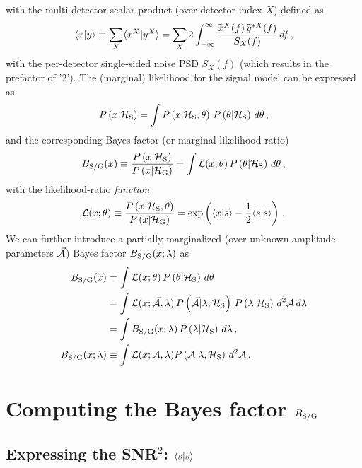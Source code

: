 \documentclass[aps,prd,onecolumn,notitlepage,nofootinbib,superscriptaddress,altaffilletter,floatfix]{revtex4-1}
\begin{document}
with the multi-detector scalar product (over detector index $X$) defined as
\begin{equation}
  \label{eq:5}
  \langle x|y\rangle\equiv \sum_{X} \langle x^X|y^X\rangle = \sum_X 2\int_{-\infty}^{\infty} \frac{\widetilde{x}^X(f)\,\widetilde{y}^{*X}(f)}{S_X(f)}\,df\,,
\end{equation}
with the per-detector single-sided noise PSD $S_X(f)$ (which results in the prefactor of '2').
The (marginal) likelihood for the signal model can be expressed as
\begin{equation}
  \label{eq:6}
  P\left(x|\mathcal{H}_{\mathrm{S}}\right) = \int P\left(x|\mathcal{H}_{\mathrm{S}},\theta\right)\,P\left(\theta|\mathcal{H}_{\mathrm{S}}\right)\,d\theta\,,
\end{equation}
and the corresponding Bayes factor (or marginal likelihood ratio)
\begin{equation}
  \label{eq:7}
  B_{\mathrm{S/G}}(x) \equiv \frac{P\left(x|\mathcal{H}_{\mathrm{S}}\right)}{P\left(x|\mathcal{H}_{\mathrm{G}}\right)} = \int \mathcal{L}(x;\theta)\,P\left(\theta|\mathcal{H}_{\mathrm{S}}\right)\,d\theta\,,
\end{equation}
with the likelihood-ratio \emph{function}
\begin{equation}
  \label{eq:8}
  \mathcal{L}(x;\theta) \equiv \frac{P\left(x|\mathcal{H}_{\mathrm{S}},\theta\right)}{P\left(x|\mathcal{H}_{\mathrm{G}}\right)} = \exp\left(\langle x|s\rangle - \frac{1}{2}\langle s|s\rangle\right)\,.
\end{equation}
We can further introduce a partially-marginalized (over unknown amplitude parameters $\vec{\mathcal{A}}$) Bayes factor $B_{\mathrm{S/G}}(x;\lambda)$ as
\begin{align}
  B_{\mathrm{S/G}}(x) &= \int \mathcal{L}(x;\theta)\,P\left(\theta|\mathcal{H}_{\mathrm{S}}\right)\,d\theta \notag\\
          &= \int \mathcal{L}(x;\vec{\mathcal{A}},\lambda)\,P\left(\vec{\mathcal{A}}|\lambda,\mathcal{H}_{\mathrm{S}}\right)\,P\left(\lambda|\mathcal{H}_{\mathrm{S}}\right)\,d^2\mathcal{A}\,d\lambda \notag\\
          &= \int B_{\mathrm{S/G}}(x;\lambda) \,P\left(\lambda|\mathcal{H}_{\mathrm{S}}\right)\,d\lambda\,,   \label{eq:23a}\\
  B_{\mathrm{S/G}}(x;\lambda) &\equiv \int \mathcal{L}(x;\mathcal{A},\lambda)P\left(\mathcal{A}|\lambda,\mathcal{H}_{\mathrm{S}}\right)\,d^2\mathcal{A}\,.  \label{eq:23b}
\end{align}

\section{Computing the Bayes factor $B_{\mathrm{S/G}}$}
\label{sec:comp-bayes-fact}

\subsection{Expressing the SNR$^2$: $\langle s|s\rangle$}
\label{sec:computing-scalarss}
\end{document}
